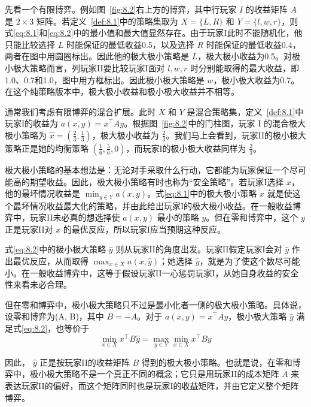 先看一个有限博弈。例如图~\ref{fig:8.2}右上方的博弈，其中行玩家 \(I\) 的收益矩阵 \(A\) 是 \(2 \times  3\) 矩阵。若定义~\ref{def:8.1}中的策略集取为 \(X = \{ L,R\}\) 和 \(Y = \{ l,w,r\}\)，则式\eqref{eq:8.1}和\eqref{eq:8.2}中的最小值和最大值显然存在。由于玩家I此时不能随机化，他只能比较选择 \(L\) 时能保证的最低收益0.5，以及选择 \(R\) 时能保证的最低收益0.4，两者在图中用圆圈标出。因此他的极大极小策略是 \(L\)，极大极小收益为0.5。对极小极大策略而言，列玩家II要比较玩家I面对 \(l,w,r\) 时分别能取得的最大收益，即1.0、0.7和1.0，图中用方框标出。因此极小极大策略是 \(w\)，极小极大收益为0.7。在这个纯策略版本中，极大极小收益和极小极大收益并不相等。

通常我们考虑有限博弈的混合扩展。此时 \(X\) 和 \(Y\) 是混合策略集，定义~\ref{def:8.1}中玩家I的收益为 \(a\left( {x,y}\right)  = {x}^{\top }{Ay}\)。根据图~\ref{fig:8.2}中的门柱图，玩家 \(\mathrm{I}\) 的混合极大极小策略为 \(\widehat{x} = \left( {\frac{2}{3},\frac{1}{3}}\right)\)，极大极小收益为 \(\frac{2}{3}\)。我们马上会看到，玩家II的极小极大策略正是她的均衡策略 \(\left( {\frac{1}{6},\frac{5}{6},0}\right)\)，而玩家I的极小极大收益同样为 \(\frac{2}{3}\)。

极大极小策略的基本想法是：无论对手采取什么行动，它都能为玩家保证一个尽可能高的期望收益。因此，极大极小策略有时也称为“安全策略”。若玩家I选择 \(x\)，他的最坏情况收益是 \(\min_{{y \in  Y}}a\left( {x,y}\right)\)。式\eqref{eq:8.1}中的极大极小策略 \(\widehat{x}\) 就是使这个最坏情况收益最大化的策略，并由此给出玩家I的极大极小收益。在一般收益博弈中，玩家II未必真的想选择使 \(a\left( {x,y}\right)\) 最小的策略 \(y\)。但在零和博弈中，这个 \(y\) 正是玩家II对 \(x\) 的最优反应，所以玩家I应当预期这种反应。

式\eqref{eq:8.2}中的极小极大策略 \(\widehat{y}\) 则从玩家II的角度出发。玩家II假定玩家I会对 \(\widehat{y}\) 作出最优反应，从而取得 \(\max_{{x \in  X}}a\left( {x,\widehat{y}}\right)\)；她选择 \(\widehat{y}\)，就是为了使这个数尽可能小。在一般收益博弈中，这等于假设玩家II一心惩罚玩家I，从她自身收益的安全性来看未必合理。

但在零和博弈中，极小极大策略只不过是最小化者一侧的极大极小策略。具体说，设零和博弈为(A, B)，其中 \(B =  - A\)。对于 \(a\left( {x,y}\right)  = {x}^{\top }{Ay}\)，极小极大策略 \(\widehat{y}\) 满足式\eqref{eq:8.2}，也等价于
\[
\min_{{x \in  X}}{x}^{\top }B\widehat{y} =\max_{{y \in  Y}}\min_{{x \in  X}}{x}^{\top }{By}
\]

因此， \(\widehat{y}\) 正是按玩家II的收益矩阵 \(B\) 得到的极大极小策略。也就是说，在零和博弈中，极小极大策略不是一个真正不同的概念；它只是用玩家II的成本矩阵 \(A\) 来表达玩家II的偏好，而这个矩阵同时也是玩家I的收益矩阵，并由它定义整个矩阵博弈。


